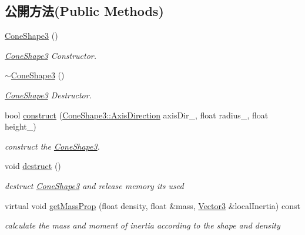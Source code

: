 \subsection*{公開方法(Public Methods)}
\begin{DoxyCompactItemize}
\item 
\hyperlink{class_i_dream_sky_1_1_cone_shape3_a71e6ebdc2ae8340a862d6d80737f9247}{Cone\+Shape3} ()
\begin{DoxyCompactList}\small\item\em \hyperlink{class_i_dream_sky_1_1_cone_shape3}{Cone\+Shape3} Constructor. \end{DoxyCompactList}\item 
\hyperlink{class_i_dream_sky_1_1_cone_shape3_a791cb68a3c6398018ecda36db4beeeae}{$\sim$\+Cone\+Shape3} ()
\begin{DoxyCompactList}\small\item\em \hyperlink{class_i_dream_sky_1_1_cone_shape3}{Cone\+Shape3} Destructor. \end{DoxyCompactList}\item 
bool \hyperlink{class_i_dream_sky_1_1_cone_shape3_afcf9be9a378121092ea4636421f1a5f6}{construct} (\hyperlink{class_i_dream_sky_1_1_cone_shape3_a809826ad2cd704859238eb0ba5482ec4}{Cone\+Shape3\+::\+Axis\+Direction} axis\+Dir\+\_\+, float radius\+\_\+, float height\+\_\+)
\begin{DoxyCompactList}\small\item\em construct the \hyperlink{class_i_dream_sky_1_1_cone_shape3}{Cone\+Shape3}. \end{DoxyCompactList}\item 
void \hyperlink{class_i_dream_sky_1_1_cone_shape3_a37b91e9e3716c959d37307d89c275fc3}{destruct} ()\hypertarget{class_i_dream_sky_1_1_cone_shape3_a37b91e9e3716c959d37307d89c275fc3}{}\label{class_i_dream_sky_1_1_cone_shape3_a37b91e9e3716c959d37307d89c275fc3}

\begin{DoxyCompactList}\small\item\em destruct \hyperlink{class_i_dream_sky_1_1_cone_shape3}{Cone\+Shape3} and release memory its used \end{DoxyCompactList}\item 
virtual void \hyperlink{class_i_dream_sky_1_1_cone_shape3_a8082855a635e33d5d9f209a953b0f15d}{get\+Mass\+Prop} (float density, float \&mass, \hyperlink{class_i_dream_sky_1_1_vector3}{Vector3} \&local\+Inertia) const 
\begin{DoxyCompactList}\small\item\em calculate the mass and moment of inertia according to the shape and density \end{DoxyCompactList}\end{DoxyCompactItemize}
